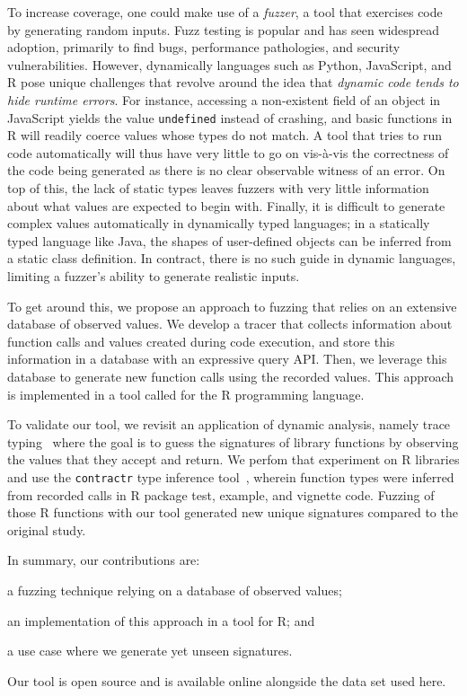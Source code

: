 \documentclass[sigplan,nonacm,anonymous,review]{acmart}
\begin{document}
To increase coverage, one could make use of a \textit{fuzzer}, a tool
that exercises code by generating random inputs.  Fuzz testing is
popular and has seen widespread adoption, primarily to find bugs,
performance pathologies, and security vulnerabilities.  However,
dynamically languages such as Python, JavaScript, and R pose unique
challenges that revolve around the idea that \textit{dynamic code
  tends to hide runtime errors}.  For instance, accessing a non-existent
field of an object in JavaScript yields the value {\tt undefined}
instead of crashing, and basic functions in R will readily coerce
values whose types do not match.  A tool that tries to run code
automatically will thus have very little to go on vis-\`a-vis the
correctness of the code being generated as there is no clear
observable witness of an error. On top of this, the lack of static
types leaves fuzzers with very little information about what values
are expected to begin with. Finally, it is difficult to generate complex
values automatically in dynamically typed languages; in a statically typed language like Java, the
shapes of user-defined objects can be inferred from a static class
definition. In contract, there is no such guide in dynamic languages, limiting
a fuzzer's ability to generate realistic inputs.

To get around this, we propose an approach to fuzzing that relies on
an extensive database of observed values.  We develop a tracer that
collects information about function calls and values created during
code execution, and store this information in a database with an
expressive query API. Then, we leverage this database to generate
new function calls using the recorded values.  This approach is
implemented in a tool called \tool for the R programming language.

To validate our tool, we revisit an application of dynamic analysis,
namely trace typing~\cite{andreasen2016trace} where the goal is to guess
the signatures of library functions by observing the values that they
accept and return. We perfom that experiment on R libraries and use
the {\tt contractr} type inference tool~\cite{turcotte2020designing},
wherein function types were inferred from recorded calls in R package
test, example, and vignette code.  Fuzzing \UFNumFunctions of those R
functions with our tool generated \UFSignatrSignaturesRnd new unique
signatures compared to the original study.

In summary, our contributions are:
\begin{inparaenum}[(1)]
\item a fuzzing technique relying on a database of observed values;
\item an implementation of this approach in a tool for R; and
\item a use case where we generate yet unseen signatures.
\end{inparaenum} 
Our tool is open source and is available online alongside the data set
used here.
\end{document}
